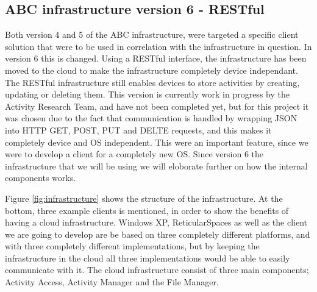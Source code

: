 \subsection{ABC infrastructure version 6 - RESTful}
Both version 4 and 5 of the ABC infrastructure, were targeted a specific client solution that were to be used in correlation with the infrastructure in question. In version 6 this is changed. Using a RESTful interface, the infrastructure has been moved to the cloud to make the infrastructure completely device independant. The RESTful infrastructure still enables devices to store activities by creating, updating or deleting them. This version is currently work in progress by the Activity Research Team, and have not been completed yet, but for this project it was chosen due to the fact that communication is handled by wrapping JSON into HTTP GET, POST, PUT and DELTE requests, and this makes it completely device and OS independent. This were an important feature, since we were to develop a client for a completely new OS. Since version 6 the infrastructure that we will be using we will eloborate further on how the internal components works.

Figure \ref{fig:infrastructure} shows the structure of the infrastructure. At the bottom, three example clients is mentioned, in order to show the benefits of having a cloud infrastructure. Windows XP, ReticularSpaces as well as the client we are going to develop are be based on three completely different platforms, and with three completely different implementations, but by keeping the infrastructure in the cloud all three implementations would be able to easily communicate with it. The cloud infrastructure consist of three main components; Activity Access, Activity Manager and the File Manager.

